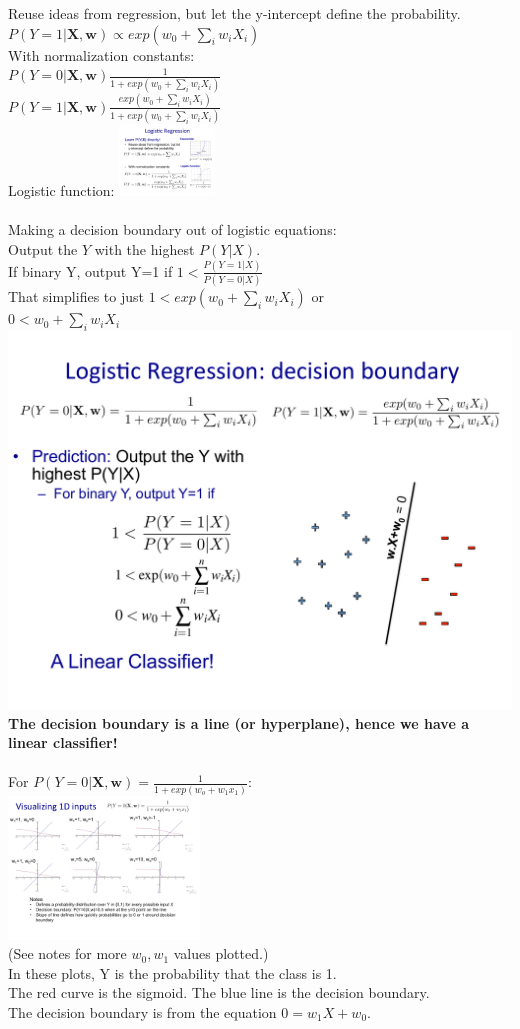 Reuse ideas from regression, but let the y-intercept define the probability.  \hfill \\
$P(Y=1|\bm{X, w}) \propto exp(w_0 + \sum_i w_i X_i)$  \hfill \\
With normalization constants:  \hfill \\
$\displaystyle  P(Y=0|\bm{X, w}) \frac{1}{1+ exp(w_0 + \sum_i w_i X_i)} $ \hfill \\
$\displaystyle  P(Y=1|\bm{X, w}) \frac{exp(w_0 + \sum_i w_i X_i)}{1+ exp(w_0 + \sum_i w_i X_i)} $ \hfill \\
Logistic function: \includegraphics[width=1in]{figures/logistic.pdf}     \hfill \\
 \hfill \\
 
Making a decision boundary out of logistic equations:  \hfill \\
Output the $Y$ with the highest $P(Y|X)$.   \hfill \\
If binary Y, output Y=1 if $\displaystyle 1 < \frac{P(Y=1|X)}{P(Y=0|X)}$  \hfill \\
That simplifies to just $1 <exp(w_0 + \sum_i w_i X_i)$ or \hfill \\
$0 <w_0 + \sum_i w_i X_i$   \hfill \\
\includegraphics[width=.8in]{figures/logistic_boundary_linear.pdf}     \hfill \\
\textbf{The decision boundary is a line (or hyperplane), hence we have a linear classifier!} \hfill \\  \hfill \\

For $ \displaystyle P(Y=0 | \bm{X,w}) = \frac{1}{1 + exp(w_o + w_1 x_1)}$:  \hfill \\
\includegraphics[width=2in]{figures/decision_boundary_example.pdf}   \hfill \\
(See notes for more $w_0, w_1$ values plotted.)  \hfill \\
In these plots, Y is the probability that the class is 1.    \hfill \\
The red curve is the sigmoid.  The blue line is the decision boundary.  \hfill \\
The decision boundary is from the equation $0 = w_1X + w_0$.  \hfill \\

